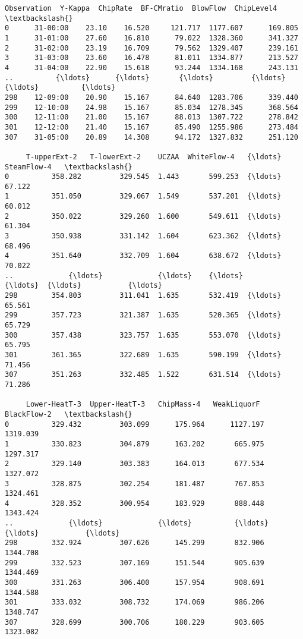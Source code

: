 \documentclass[11pt]{article}
\makeatletter
\newcommand{\boxspacing}{\kern\kvtcb@left@rule\kern\kvtcb@boxsep}
\newcommand{\prompt}[4]{
        {\ttfamily\llap{{\color{#2}[#3]:\hspace{3pt}#4}}\vspace{-\baselineskip}}
    }
\makeatother
\begin{document}
            \begin{tcolorbox}[breakable, size=fbox, boxrule=.5pt, pad at break*=1mm, opacityfill=0]
\prompt{Out}{outcolor}{15}{\boxspacing}
\begin{Verbatim}[commandchars=\\\{\}]
    Observation  Y-Kappa  ChipRate  BF-CMratio  BlowFlow  ChipLevel4   \textbackslash{}
0      31-00:00    23.10    16.520     121.717  1177.607      169.805
1      31-01:00    27.60    16.810      79.022  1328.360      341.327
2      31-02:00    23.19    16.709      79.562  1329.407      239.161
3      31-03:00    23.60    16.478      81.011  1334.877      213.527
4      31-04:00    22.90    15.618      93.244  1334.168      243.131
..          {\ldots}      {\ldots}       {\ldots}         {\ldots}       {\ldots}          {\ldots}
298    12-09:00    20.90    15.167      84.640  1283.706      339.440
299    12-10:00    24.98    15.167      85.034  1278.345      368.564
300    12-11:00    21.00    15.167      88.013  1307.722      278.842
301    12-12:00    21.40    15.167      85.490  1255.986      273.484
307    31-05:00    20.89    14.308      94.172  1327.832      251.120

     T-upperExt-2   T-lowerExt-2    UCZAA  WhiteFlow-4   {\ldots}  SteamFlow-4   \textbackslash{}
0          358.282         329.545  1.443       599.253  {\ldots}        67.122
1          351.050         329.067  1.549       537.201  {\ldots}        60.012
2          350.022         329.260  1.600       549.611  {\ldots}        61.304
3          350.938         331.142  1.604       623.362  {\ldots}        68.496
4          351.640         332.709  1.604       638.672  {\ldots}        70.022
..             {\ldots}             {\ldots}    {\ldots}           {\ldots}  {\ldots}           {\ldots}
298        354.803         311.041  1.635       532.419  {\ldots}        65.561
299        357.723         321.387  1.635       520.365  {\ldots}        65.729
300        357.438         323.757  1.635       553.070  {\ldots}        65.795
301        361.365         322.689  1.635       590.199  {\ldots}        71.456
307        351.263         332.485  1.522       631.514  {\ldots}        71.286

     Lower-HeatT-3  Upper-HeatT-3   ChipMass-4   WeakLiquorF   BlackFlow-2   \textbackslash{}
0          329.432         303.099      175.964      1127.197      1319.039
1          330.823         304.879      163.202       665.975      1297.317
2          329.140         303.383      164.013       677.534      1327.072
3          328.875         302.254      181.487       767.853      1324.461
4          328.352         300.954      183.929       888.448      1343.424
..             {\ldots}             {\ldots}          {\ldots}           {\ldots}           {\ldots}
298        332.924         307.626      145.299       832.906      1344.708
299        332.523         307.169      151.544       905.639      1344.469
300        331.263         306.400      157.954       908.691      1344.588
301        333.032         308.732      174.069       986.206      1348.747
307        328.699         300.706      180.229       903.605      1323.082


\end{Verbatim}
\end{tcolorbox}
\end{document}
